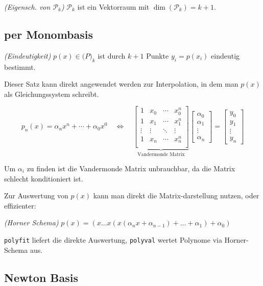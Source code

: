 \inlinetheorem \textit{(Eigensch. von $\mathcal{P}_k$)} $\mathcal{P}_k$ ist ein Vektorraum mit $\dim(\mathcal{P}_k) = k+1$.

\subsection{per Monombasis}

\inlinetheorem \textit{(Eindeutigkeit)} $p(x) \in \mathcal(P)_k$ ist durch $k+1$ Punkte $y_i = p(x_i)$ eindeutig bestimmt.

Dieser Satz kann direkt angewendet werden zur Interpolation, in dem man $p(x)$ als Gleichungssystem schreibt.

$$
p_n(x) = \alpha_n x^n + \cdots + \alpha_0 x^0 \quad \iff \quad 
\underbrace{
    \begin{bmatrix}
    1 & x_0 & \cdots & x_0^n \\
    1 & x_1 & \cdots & x_1^n \\
    \vdots  & \vdots & \ddots & \vdots \\
    1 & x_n & \cdots & x_n^n \\
    \end{bmatrix}
}_\text{Vandermonde Matrix}
\begin{bmatrix}
    \alpha_0 \\
    \alpha_1 \\
    \vdots   \\
    \alpha_n
\end{bmatrix}
=
\begin{bmatrix}
    y_0 \\
    y_1 \\
    \vdots \\
    y_n
\end{bmatrix}
$$

Um $\alpha_i$ zu finden ist die Vandermonde Matrix unbrauchbar, da die Matrix schlecht konditioniert ist.

Zur Auswertung von $p(x)$ kann man direkt die Matrix-darstellung nutzen, oder effizienter:

\inlinedef \textit{(Horner Schema)} $p(x) = (x \ldots x ( x (\alpha_n x + \alpha_{n-1}) + \ldots + \alpha_1) + \alpha_0)$

 \verb|polyfit| liefert die direkte Auswertung, \verb|polyval| wertet Polynome via Horner-Schema aus.

\subsection{Newton Basis}